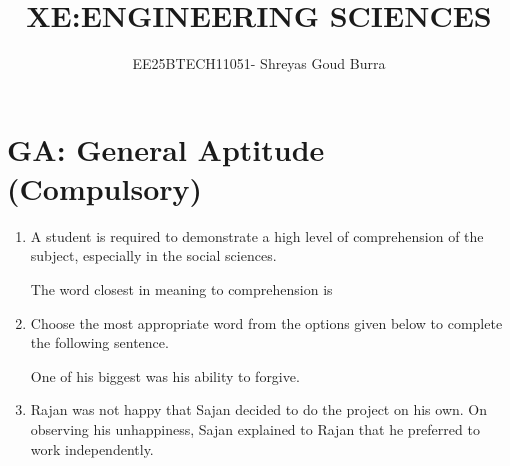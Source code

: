 \documentclass[a4paper,10pt]{article}
\title{XE:ENGINEERING SCIENCES}
\author{EE25BTECH11051- Shreyas Goud Burra}
\date{}
\begin{document}
\maketitle

\section*{GA: General Aptitude (Compulsory)}

\begin{enumerate}
    \item A student is required to demonstrate a high level of comprehension of the subject, especially in the social sciences.
    
    The word closest in meaning to comprehension is \underline{\hspace{2cm}}
    
    \hfill{}
    \begin{enumerate}[label=\Alph*)]
    \end{enumerate}

    \item Choose the most appropriate word from the options given below to complete the following sentence.
    
    One of his biggest \underline{\hspace{2cm}} was his ability to forgive.
    
    \hfill{}
    \begin{enumerate}[label=\Alph*)]
    \end{enumerate}

    \item Rajan was not happy that Sajan decided to do the project on his own. On observing his unhappiness, Sajan explained to Rajan that he preferred to work independently.
    

\end{enumerate}
\end{document}
